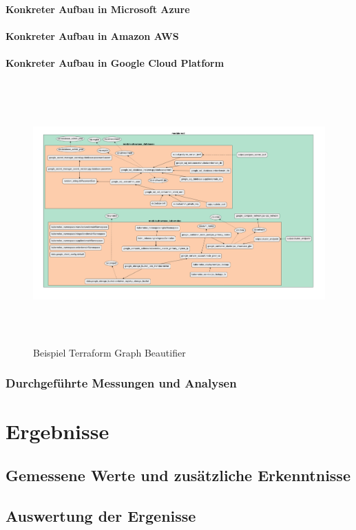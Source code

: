 \subsubsection{Konkreter Aufbau in Microsoft Azure}

\subsubsection{Konkreter Aufbau in Amazon AWS}

\subsubsection{Konkreter Aufbau in Google Cloud Platform}

\begin{figure}[H]
  \includegraphics[keepaspectratio, height=10cm]{fig/hauptteil/gcp-terraform-graph-beautifier.png}
  \caption{Beispiel Terraform Graph Beautifier}
  \centering
\end{figure}

\subsection{Durchgeführte Messungen und Analysen}

\chapter{Ergebnisse}
\label{sec:ergeb}

\section{Gemessene Werte und zusätzliche Erkenntnisse}

\section{Auswertung der Ergenisse}
